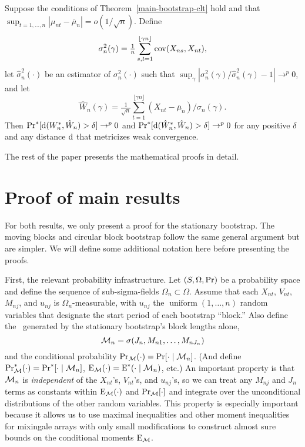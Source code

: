 \documentclass[11pt]{article}
\begin{document}
\begin{cor}
  Suppose the conditions of Theorem~\ref{main-bootstrap-clt} hold and
  that $\sup_{t=1,\dots,n}|\mu_{nt} - \bar \mu_n| = o(1/\sqrt{n})$. Define
  \begin{equation}
    \label{eq:8}
    \sigma_n^2(\gamma) = \tfrac{1}{n}
    \sum_{s,t=1}^{\lfloor \gamma n \rfloor} \operatorname{cov}(X_{ns}, X_{nt}),
  \end{equation}
  let $\hat\sigma_n^2(\cdot)$ be an estimator of $\sigma_n^2(\cdot)$
  such that $\sup_{\gamma} |\sigma_n^2(\gamma) /
  \hat{\sigma}_n^2(\gamma) - 1| \to^p 0$, and let
  \begin{equation}
    \label{eq:9}
    \hat{W}_n(\gamma) = \tfrac{1}{\sqrt{n}} \sum_{t=1}^{\lfloor \gamma
      n \rfloor} (X_{nt} - \bar\mu_n) / \hat{\sigma}_{n}(\gamma).
  \end{equation}
  Then $\operatorname{Pr}^{*}[\operatorname{d}(W_n^{*}, \hat{W}_n) > \delta] \to^p 0$ and
  $\operatorname{Pr}^{*}[\operatorname{d}(\hat{W}_n^{*}, \hat{W}_n) > \delta] \to^p 0$ for any
  positive $\delta$ and any distance $\operatorname{d}$ that metricizes weak
  convergence.
\end{cor}

The rest of the paper presents the mathematical proofs in detail.

\appendix
\section{Proof of main results}

For both results, we only present a proof for the stationary
bootstrap. The moving blocks and circular block bootstrap follow the
same general argument but are simpler. We will define some additional
notation here before presenting the proofs.

First, the relevant probability infrastructure.  Let
$(S, \Omega, \operatorname{Pr})$ be a probability space and define the sequence of
sub-sigma-fields $\Omega_n \subset \Omega$. Assume that each
$X_{nt}$, $V_{nt}$, $M_{nj}$, and $u_{nj}$ is $\Omega_n$-measurable,
with $u_{nj}$ the $\operatorname{uniform}(1,\dots,n)$ random variables
that designate the start period of each bootstrap ``block.'' Also
define the \sigmafield\ generated by the stationary bootstrap's block
lengths alone,
\begin{equation}
  \mathcal{M}_n = \sigma(J_{n}, M_{n1},\dots,M_{nJ_n})
\end{equation}
and the conditional probability $\operatorname{Pr}_{\mathcal{M}}(\cdot) = \operatorname{Pr}[\cdot \mid \mathcal{M}_n]$.
(And define $\operatorname{Pr}_{\mathcal{M}}^*(\cdot) = \operatorname{Pr}^*[\cdot \mid \mathcal{M}_n]$, $\operatorname{E}_{\mathcal{M}}(\cdot) =
\operatorname{E}^*(\cdot \mid \mathcal{M}_n)$, etc.) An important property is
that $\mathcal{M}_n$ is \emph{independent} of the $X_{nt}$'s, $V_{nt}$'s, and
$u_{nj}$'s, so we can treat any
$M_{nj}$ and $J_n$ terms as constants within $\operatorname{E}_{\mathcal{M}}(\cdot)$ and
$\operatorname{Pr}_{\mathcal{M}}[\cdot]$ and integrate over the unconditional distributions of the
other random variables. This property is especially important because it allows us
to use maximal inequalities and other moment inequalities for
mixingale arrays with only small modifications to construct almost sure bounds on the
conditional moments $\operatorname{E}_{\mathcal{M}}$.
\end{document}
